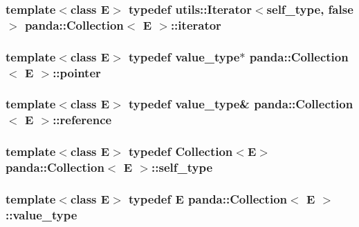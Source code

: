 \label{classpanda_1_1Collection_a0b74becc406f47de15442c670ae70caf}
\hypertarget{classpanda_1_1Collection_af5db8970e7a032f09aa723c91ebf2e84}{
\subsubsection[{iterator}]{\setlength{\rightskip}{0pt plus 5cm}template$<$class E$>$ typedef {\bf utils::Iterator}$<${\bf self\_\-type}, false$>$ {\bf panda::Collection}$<$ E $>$::{\bf iterator}}}
\label{classpanda_1_1Collection_af5db8970e7a032f09aa723c91ebf2e84}
\hypertarget{classpanda_1_1Collection_ab3c725349a6a4adb0c0d9258d86d60fe}{
\subsubsection[{pointer}]{\setlength{\rightskip}{0pt plus 5cm}template$<$class E$>$ typedef {\bf value\_\-type}$\ast$ {\bf panda::Collection}$<$ E $>$::{\bf pointer}}}
\label{classpanda_1_1Collection_ab3c725349a6a4adb0c0d9258d86d60fe}
\hypertarget{classpanda_1_1Collection_a908a535fcc02ad985ac9eb974f02546f}{
\subsubsection[{reference}]{\setlength{\rightskip}{0pt plus 5cm}template$<$class E$>$ typedef {\bf value\_\-type}\& {\bf panda::Collection}$<$ E $>$::{\bf reference}}}
\label{classpanda_1_1Collection_a908a535fcc02ad985ac9eb974f02546f}
\hypertarget{classpanda_1_1Collection_a0e17bbfa4853912ae5e3d1fdff2299e2}{
\subsubsection[{self\_\-type}]{\setlength{\rightskip}{0pt plus 5cm}template$<$class E$>$ typedef {\bf Collection}$<$E$>$ {\bf panda::Collection}$<$ E $>$::{\bf self\_\-type}}}
\label{classpanda_1_1Collection_a0e17bbfa4853912ae5e3d1fdff2299e2}
\hypertarget{classpanda_1_1Collection_a9df859281619e6213192b6f7af902d76}{
\subsubsection[{value\_\-type}]{\setlength{\rightskip}{0pt plus 5cm}template$<$class E$>$ typedef E {\bf panda::Collection}$<$ E $>$::{\bf value\_\-type}}}
\label{classpanda_1_1Collection_a9df859281619e6213192b6f7af902d76}



